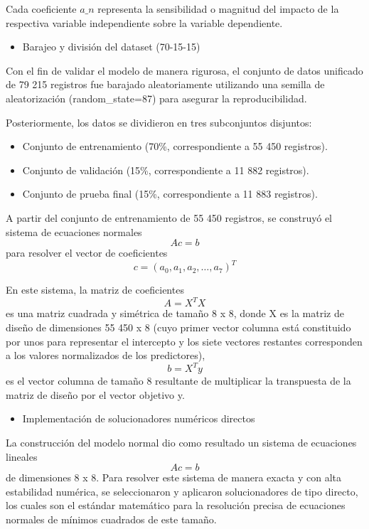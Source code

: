\documentclass[12pt]{report}
\begin{document}
Cada coeficiente $a\_n$ representa la sensibilidad o magnitud del impacto de la respectiva variable independiente sobre la variable dependiente.

\begin{itemize}
    \item Barajeo y división del dataset (70-15-15)
\end{itemize}
Con el fin de validar el modelo de manera rigurosa, el conjunto de datos unificado de 79 215 registros fue barajado aleatoriamente utilizando una semilla de aleatorización (random\_state=87) para asegurar la reproducibilidad.

Posteriormente, los datos se dividieron en tres subconjuntos disjuntos: 
\begin{itemize}
    \item Conjunto de entrenamiento (70\%, correspondiente a 55 450 registros).
    \item Conjunto de validación (15\%, correspondiente a 11 882 registros).
    \item Conjunto de prueba final (15\%, correspondiente a 11 883 registros).
\end{itemize}

A partir del conjunto de entrenamiento de 55 450 registros, se construyó el sistema de ecuaciones normales
$$ Ac = b $$
para resolver el vector de coeficientes
$$ c = (a_0, a_1, a_2, \dots , a_7)^T $$

En este sistema, la matriz de coeficientes 
$$ A = X^T X $$
es una matriz cuadrada y simétrica de tamaño 8 x 8, donde X es la matriz de diseño de dimensiones 55 450 x 8 (cuyo primer vector columna está constituido por unos para representar el intercepto y los siete vectores restantes corresponden a los valores normalizados de los predictores), 
$$ b = X^T y $$
es el vector columna de tamaño 8 resultante de multiplicar la transpuesta de la matriz de diseño por el vector objetivo y.

\begin{itemize}
    \item Implementación de solucionadores numéricos directos
\end{itemize}
La construcción del modelo normal dio como resultado un sistema de ecuaciones lineales
$$ A c = b $$
de dimensiones 8 x 8. Para resolver este sistema de manera exacta y con alta estabilidad numérica, se seleccionaron y aplicaron solucionadores de tipo directo, los cuales son el estándar matemático para la resolución precisa de ecuaciones normales de mínimos cuadrados de este tamaño.
\end{document}
